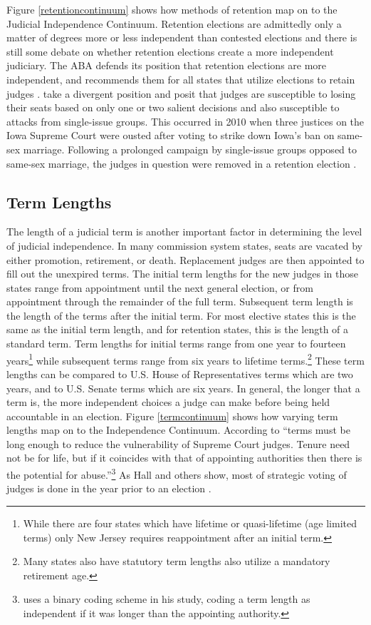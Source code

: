 \documentclass[12pt]{article}
\begin{document}
Figure \ref{retentioncontinuum} shows how methods of retention map on to the Judicial Independence Continuum.  Retention elections are admittedly only a matter of degrees more or less independent than contested elections and there is still some debate on whether retention elections create a more independent judiciary. The ABA defends its position that retention elections are more independent, and recommends them for all states that utilize elections to retain judges \citep{ABA2003}.  \citet{Canes-Wrone2012} take a divergent position and posit that judges are susceptible to losing their seats based on only one or two salient decisions and also susceptible to attacks from single-issue groups.  This occurred in 2010 when three justices on the Iowa Supreme Court were ousted after voting to strike down Iowa's ban on same-sex marriage. Following a prolonged campaign by single-issue groups opposed to same-sex marriage, the judges in question were removed in a retention election \citep{Iowa2010}.

\subsection*{Term Lengths}
The length of a judicial term is another important factor in determining the level of judicial independence.  In many commission system states, seats are vacated by either promotion, retirement, or death. Replacement judges are then appointed to fill out the unexpired terms. The initial term lengths for the new judges in those states range from appointment until the next general election, or from appointment through the remainder of the full term. Subsequent term length is the length of the terms after the initial term. For most elective states this is the same as the initial term length, and for retention states, this is the length of a standard term. Term lengths for initial terms range from one year to fourteen years\footnote{While there are four states which have lifetime or quasi-lifetime (age limited terms) only New Jersey requires reappointment after an initial term.} while subsequent terms range from six years to lifetime terms.\footnote{Many states also have statutory term lengths also utilize a mandatory retirement age.}  These term lengths can be compared to U.S. House of Representatives terms which are two years, and  to U.S. Senate terms which are six years.  In general, the longer that a term is, the more independent choices a judge can make before being held accountable in an election.  Figure \ref{termcontinuum} shows how varying term lengths map on to the Independence Continuum.  According to \citet[31]{Rios2006} ``terms must be long enough to reduce the vulnerability of Supreme Court judges.  Tenure need not be for life, but if it coincides with that of appointing authorities then there is the potential for abuse.''\footnote{\citet{Rios2006} uses a binary coding scheme in his study, coding a term length as independent if it was longer than the appointing authority.}  As Hall and others show, most of strategic voting of judges is done in the year prior to an election \citep{Hall1987b,Hall1985,Brace2008,Canes-Wrone2012}.  
\end{document}
